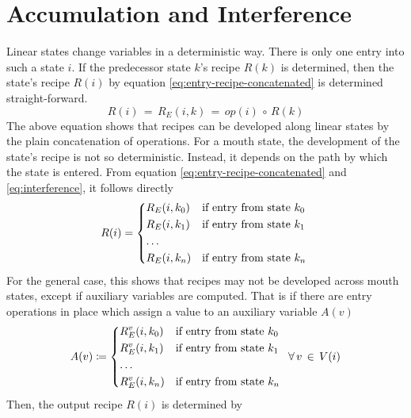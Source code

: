 \documentclass[12pt,a4paper]{scrartcl}
\begin{document}
\section{Accumulation and Interference}

Linear states change variables in a deterministic way. There is only one entry
into such a state $i$. If the predecessor state $k$'s recipe $R(k)$ is
determined, then the state's recipe $R(i)$ by equation \eqref{eq:entry-recipe-concatenated} 
is determined straight-forward.
\begin{equation} \label{eq:linear-state-recipe}
    R(i) \,=\,R_E(i,k) \,=\, op(i)\,\circ\,R(k)
\end{equation}
The above equation shows that recipes can be developed along linear states by
the plain concatenation of operations.  For a mouth state, the development of the
state's recipe is not so deterministic.  Instead, it depends on the path by
which the state is entered.  From equation \eqref{eq:entry-recipe-concatenated}
and \eqref{eq:interference}, it follows directly
\begin{equation} \label{eq:mouth-state-recipe}
    R(i) = \begin{dcases*}
             R_E(i,k_0) & if entry from state $k_0$ \\
             R_E(i,k_1) & if entry from state $k_1$ \\
             \ldots \\
             R_E(i,k_n) & if entry from state $k_n$ \\
            \end{dcases*}
\end{equation}
For the general case, this shows that recipes may not be developed across
mouth states, except if auxiliary variables are computed. That is if there
are entry operations in place which assign a value to an auxiliary variable $A(v)$
\begin{equation}
    A(v) \coloneqq   \begin{dcases*}
             R^v_E(i,k_0) & if entry from state $k_0$ \\
             R^v_E(i,k_1) & if entry from state $k_1$ \\
             \ldots \\
             R^v_E(i,k_n) & if entry from state $k_n$ \\
            \end{dcases*}
            \,\forall\,v\,\in\,V(i)
\end{equation}
Then, the output recipe $R(i)$ is determined by
\end{document}
